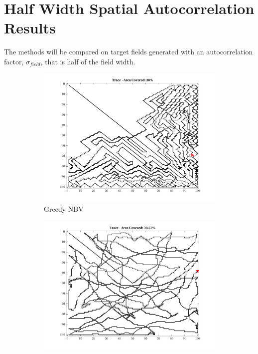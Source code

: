 \FloatBarrier
\clearpage\

\section{Half Width Spatial Autocorrelation Results}
The methods will be compared on target fields generated with an autocorrelation factor, $\sigma_{field}$, that is half of the field width.
\begin{figure}[htb!]
    \centering
    \begin{subfigure}[t]{0.25\textwidth}
        \centering
        \includegraphics[width=\linewidth]{figures/path_greedy_30p_100x100_sf_50_seed_1.png}
        \captionsetup{skip=0.20\baselineskip,size=footnotesize}
        \caption{Greedy NBV}
    \end{subfigure}%
    \begin{subfigure}[t]{0.25\textwidth}
        \centering
        \includegraphics[width=\linewidth]{figures/path_mc_30p_100x100_sf_50_seed_1.png}

\end{subfigure}
\end{figure}
